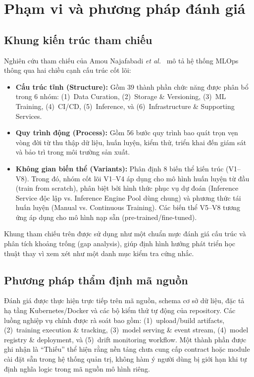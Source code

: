 \section{Phạm vi và phương pháp đánh giá}

\subsection{Khung kiến trúc tham chiếu}
Nghiên cứu tham chiếu của Amou Najafabadi \textit{et al.}~\cite{najafabadi2026} mô tả hệ thống MLOps thông qua hai chiều cạnh cấu trúc cốt lõi:
\begin{itemize}
  \item \textbf{Cấu trúc tĩnh (Structure):} Gồm 39 thành phần chức năng được phân bổ trong 6 nhóm: (1)~Data Curation, (2)~Storage \& Versioning, (3)~ML Training, (4)~CI/CD, (5)~Inference, và (6)~Infrastructure \& Supporting Services.
  \item \textbf{Quy trình động (Process):} Gồm 56 bước quy trình bao quát trọn vẹn vòng đời từ thu thập dữ liệu, huấn luyện, kiểm thử, triển khai đến giám sát và bảo trì trong môi trường sản xuất.
  \item \textbf{Không gian biến thể (Variants):} Phân định 8 biến thể kiến trúc (V1--V8). Trong đó, nhóm cốt lõi V1--V4 áp dụng cho mô hình huấn luyện từ đầu (train from scratch), phân biệt bởi hình thức phục vụ dự đoán (Inference Service độc lập vs. Inference Engine Pool dùng chung) và phương thức tái huấn luyện (Manual vs. Continuous Training). Các biến thể V5--V8 tương ứng áp dụng cho mô hình nạp sẵn (pre-trained/fine-tuned).
\end{itemize}

Khung tham chiếu trên được sử dụng như một chuẩn mực đánh giá cấu trúc và phân tích khoảng trống (gap analysis), giúp định hình hướng phát triển học thuật thay vì xem xét như một danh mục kiểm tra cứng nhắc.

\subsection{Phương pháp thẩm định mã nguồn}
Đánh giá được thực hiện trực tiếp trên mã nguồn, schema cơ sở dữ liệu, đặc tả hạ tầng Kubernetes/Docker và các bộ kiểm thử tự động của repository. Các luồng nghiệp vụ chính được rà soát bao gồm: (1)~upload/build artifacts, (2)~training execution \& tracking, (3)~model serving \& event stream, (4)~model registry \& deployment, và (5)~drift monitoring workflow. Một thành phần được ghi nhận là ``Thiếu'' thể hiện rằng nền tảng chưa cung cấp contract hoặc module cài đặt sẵn trong hệ thống quản trị, không hàm ý người dùng bị giới hạn khi tự định nghĩa logic trong mã nguồn mô hình riêng.
